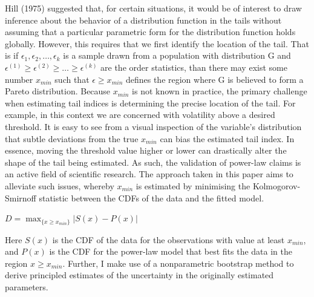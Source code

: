 \documentclass[11pt,a4paper,oldfontcommands]{memoir}
\begin{document}
{Hill (1975) suggested that, for certain situations, it would be of interest to draw inference about the behavior of a distribution function in the tails without assuming that a particular parametric form for the distribution function holds globally. However, this requires that we first identify the location of the tail. That is if $\epsilon_1, \epsilon_2,\dots, \epsilon_k$ is a sample drawn from a population with distribution G and $\epsilon^{(1)} \ge  \epsilon^{(2)} \ge \dots \ge \epsilon^{(k)}$ are the order statistics, than there may exist some number $x_{min}$ such that $\epsilon\ge x_{min}$ defines the region where G is believed to form a Pareto distribution. Because $x_{min}$ is not known in practice, the primary challenge when estimating tail indices is determining the precise location of the tail. For example, in this context we are concerned with volatility above a desired threshold. It is easy to see from a visual inspection of the variable's distribution that subtle deviations from the true $x_{min}$ can bias the estimated tail index. In essence, moving the threshold value higher or lower can drastically alter the shape of the tail being estimated. As such, the validation of power-law claims is an active field of scientific research. The approach taken in this paper aims to alleviate such issues, whereby $x_{min}$ is estimated by minimising the Kolmogorov-Smirnoff statistic between the CDFs of the data and the fitted model. 

\begin{center}
    
$D= \max_{\{x \geq x_{min}\}} |S(x) - P(x)|$
\end{center}

\begin{flushleft}
Here $S(x)$ is the CDF of the data for the observations with value at least $x_{min}$, and $P(x)$ is the CDF for the power-law model that best fits the data in the region $x \ge x_{min}$. Further, I make use of a nonparametric bootstrap method to derive principled estimates of the uncertainty in the originally estimated parameters. 

\end{flushleft}


}
\end{document}
